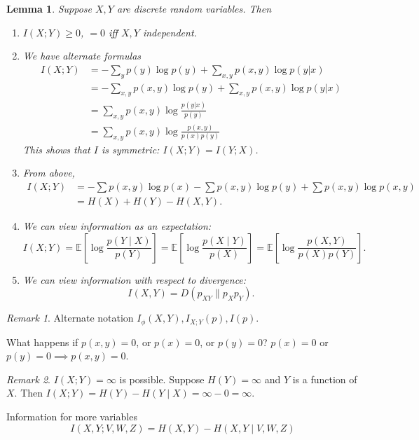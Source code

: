 \documentclass{report}
\newtheorem{lemma}{Lemma}[section]
\theoremstyle{definition}
\theoremstyle{remark}
\newtheorem*{remark}{Remark}
\numberwithin{equation}{section}
\begin{document}
\begin{lemma}
  Suppose $X, Y$ are discrete random variables. Then
  \begin{enumerate}
    \item $I(X; Y) \geq 0$, $= 0$ iff $X, Y$ independent.
    \item We have alternate formulas \begin{align*}
      I(X; Y) & = - \sum_{y} p(y) \log p(y) + \sum_{x, y} p(x, y) \log p(y|x) \\
      & = - \sum_{x, y} p(x, y) \log p(y) + \sum_{x, y} p(x, y) \log p(y|x) \\
      & = \sum_{x, y} p(x, y) \log \frac{p(y | x)}{p(y)} \\
      & = \sum_{x, y} p(x, y) \log \frac{p(x, y)}{p(x)p(y)} 
    \end{align*}
    This shows that $I$ is symmetric: $I(X; Y) = I(Y; X)$.
  
    \item From above, \begin{align*}
      I(X; Y) & = -\sum p(x, y)\log p(x) - \sum p(x, y)\log p(y) + \sum p(x, y)\log p(x, y) \\
      & = H(X) + H(Y) - H(X, Y).
    \end{align*}
  
    \item We can view information as an expectation: \[I(X; Y) = \mathbb{E}\left[\log \frac{p(Y \mid X)}{p(Y)}\right] = \mathbb{E}\left[\log \frac{p(X \mid Y)}{p(X)}\right] = \mathbb{E}\left[\log \frac{p(X, Y)}{p(X)p(Y)}\right].\]
    \item We can view information with respect to divergence: \[I(X, Y) = D(p_{XY} \| p_Xp_Y).\]
  \end{enumerate}
\end{lemma}

\begin{remark}
  Alternate notation \(
    I_\phi(X, Y), I_{X; Y}(p), I(p).  
  \)
\end{remark}

What happens if $p(x, y) = 0$, or $p(x) = 0$, or $p(y) = 0$? $p(x) = 0$ or $p(y) = 0 \implies p(x, y) = 0$.

\begin{remark}
  $I(X;Y) = \infty$ is possible. Suppose $H(Y) = \infty$ and $Y$ is a function of $X$. Then $I(X; Y) = H(Y) - H(Y \mid X) = \infty - 0 = \infty$.
\end{remark}

Information for more variables \[
  I(X, Y ; V, W, Z) = H(X,Y) - H(X,Y \mid V, W, Z)  
\]
\end{document}
